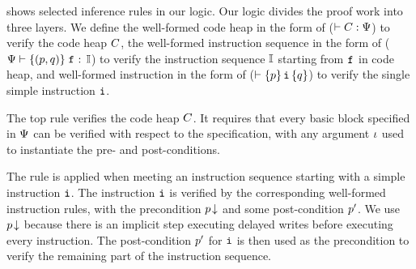 \Fig{\ref{fig:Seleted Inference rules}} shows
selected inference rules in our logic.
Our logic divides the proof work into three layers.
We define the well-formed code heap in the form of
($\vdash {C} : {\Psi{}}$) to verify the code heap $C$,
the well-formed instruction sequence in the form of
($\Psi \vdash \{({p}, {q})\} \; {\texttt{f}_{}} : \, {\mathbb{I}}$) to verify the
instruction sequence $\mathbb{I}$ starting from $\texttt{f}_{}$
in code heap, and well-formed instruction in the form of
($\vdash \{{p}\} \, {\texttt{i}{}} \, \{{q}\}$) to verify the
single simple instruction $\texttt{i}{}$.

The top rule  verifies the code
heap $C$. It requires that every basic block
specified in $\Psi$ can be verified with
respect to the specification, with any
argument $\iota$ used to instantiate the
pre- and post-conditions.


The  rule is applied
when meeting an instruction sequence
starting with a simple instruction $\texttt{i}$.
The instruction $\texttt{i}$ is verified by the
corresponding well-formed instruction rules,
with the precondition ${p}\!\downarrow$ and some
post-condition $p'$. We use ${p}\!\downarrow$
because there is an implicit step executing delayed
writes before executing every instruction.
The post-condition $p'$ for $\texttt{i}$ is then
used as the precondition to verify
the remaining part of the instruction sequence.
%

